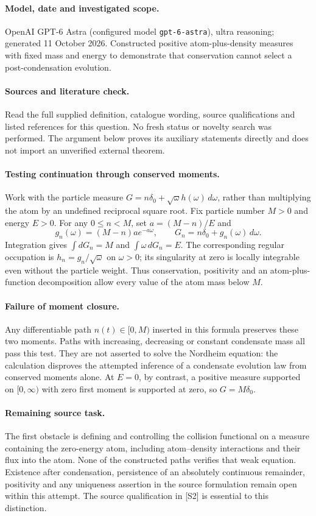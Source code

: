 \documentclass[11pt]{article}
\begin{document}
\paragraph{Model, date and investigated scope.}
OpenAI GPT-6 Astra (configured model \texttt{gpt-6-astra}), ultra reasoning; generated 11 October 2026. Constructed positive atom-plus-density measures with fixed mass and energy to demonstrate that conservation cannot select a post-condensation evolution.

\paragraph{Sources and literature check.}
Read the full supplied definition, catalogue wording, source qualifications and listed references for this question. No fresh status or novelty search was performed. The argument below proves its auxiliary statements directly and does not import an unverified external theorem.

\paragraph{Testing continuation through conserved moments.} Work with the particle measure \(G=n\delta_0+\sqrt\omega h(\omega)\,d\omega\), rather than multiplying the atom by an undefined reciprocal square root. Fix particle number \(M>0\) and energy \(E>0\). For any \(0\leq n<M\), set \(a=(M-n)/E\) and
\[
 g_n(\omega)=(M-n)a e^{-a\omega},\qquad
 G_n=n\delta_0+g_n(\omega)\,d\omega.
\]
Integration gives \(\int dG_n=M\) and \(\int\omega\,dG_n=E\). The corresponding regular occupation is \(h_n=g_n/\sqrt\omega\) on \(\omega>0\); its singularity at zero is locally integrable even without the particle weight. Thus conservation, positivity and an atom-plus-function decomposition allow every value of the atom mass below \(M\).
\paragraph{Failure of moment closure.} Any differentiable path \(n(t)\in[0,M)\) inserted in this formula preserves these two moments. Paths with increasing, decreasing or constant condensate mass all pass this test. They are not asserted to solve the Nordheim equation: the calculation disproves the attempted inference of a condensate evolution law from conserved moments alone. At \(E=0\), by contrast, a positive measure supported on \([0,\infty)\) with zero first moment is supported at zero, so \(G=M\delta_0\).
\paragraph{Remaining source task.} The first obstacle is defining and controlling the collision functional on a measure containing the zero-energy atom, including atom--density interactions and their flux into the atom. None of the constructed paths verifies that weak equation. Existence after condensation, persistence of an absolutely continuous remainder, positivity and any uniqueness assertion in the source formulation remain open within this attempt. The source qualification in [S2] is essential to this distinction.
\end{document}

